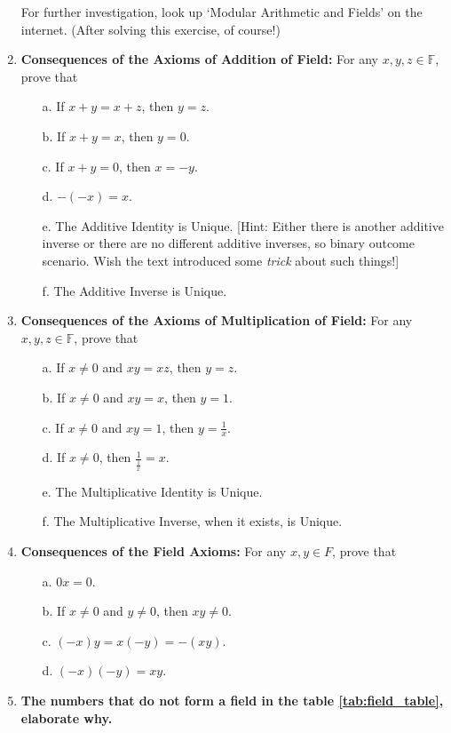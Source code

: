 \begin{enumerate}[label=\textbf{\arabic*.}]
\begin{enumerate}
    \end{enumerate}
    For further investigation, look up `Modular Arithmetic and Fields' on the internet. (After solving this exercise, of course!)
    \item \textbf{Consequences of the Axioms of Addition of Field:} For any $x,y,z\in\mathbb{F}$, prove that
    \begin{enumerate}
        \item[a.] If $x+y=x+z$, then $y=z$.
        \item[b.] If $x+y=x$, then $y=0$.
        \item[c.] If $x+y=0$, then $x=-y$.
        \item[d.] $-(-x)=x$.
        \item[e.] The Additive Identity is Unique\footnotemark. [Hint: Either there is another additive inverse or there are no different additive inverses, so binary outcome scenario. Wish the text introduced some \textit{trick} about such things!]
        \item[f.] The Additive Inverse is Unique.
    \end{enumerate}
    \item \textbf{Consequences of the Axioms of Multiplication of Field:} For any $x,y,z\in\mathbb{F}$, prove that
    \begin{enumerate}
        \item[a.] If $x\neq0$ and $xy=xz$, then $y=z$.
        \item[b.] If $x\neq0$ and $xy=x$, then $y=1$.
        \item[c.] If $x\neq0$ and $xy=1$, then $y=\frac{1}{x}$.
        \item[d.] If $x\neq0$, then $\frac{1}{\frac{1}{x}}=x$.
        \item[e.] The Multiplicative Identity is Unique.
        \item[f.] The Multiplicative Inverse, when it exists, is Unique. 
    \end{enumerate}
    \item \textbf{Consequences of the Field Axioms:} For any $x,y\in F$, prove that
    \begin{enumerate}
        \item[a.] $0x=0$.
        \item[b.] If $x\neq0$ and $y\neq0$, then $xy\neq0$.
        \item[c.] $(-x)y=x(-y)=-(xy)$.
        \item[d.] $(-x)(-y)=xy$.
    \end{enumerate}
    \item \textbf{The numbers that do not form a field in the table \eqref{tab:field_table}, elaborate why.}
\end{enumerate}
